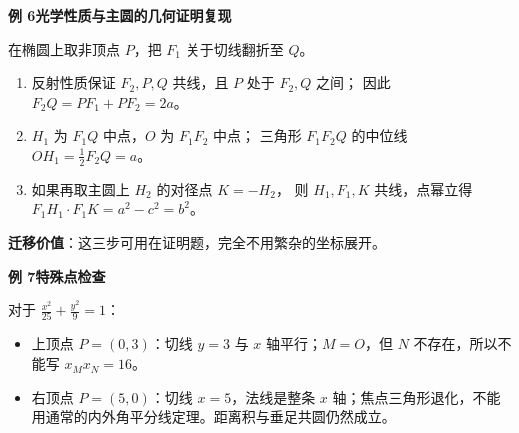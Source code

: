 \begin{examplebox}
\medskip
\textbf{例 6\quad 光学性质与主圆的几何证明复现}

在椭圆上取非顶点 $P$，把 $F_1$ 关于切线翻折至 $Q$。
\begin{enumerate}
\item 反射性质保证 $F_2,P,Q$ 共线，且 $P$ 处于 $F_2,Q$ 之间；
因此 $F_2Q=PF_1+PF_2=2a$。
\item $H_1$ 为 $F_1Q$ 中点，$O$ 为 $F_1F_2$ 中点；
三角形 $F_1F_2Q$ 的中位线 $OH_1=\frac12F_2Q=a$。
\item 如果再取主圆上 $H_2$ 的对径点 $K=-H_2$，
则 $H_1,F_1,K$ 共线，点幂立得
$F_1H_1\cdot F_1K=a^2-c^2=b^2$。
\end{enumerate}
\textbf{迁移价值}：这三步可用在证明题，完全不用繁杂的坐标展开。

\medskip
\textbf{例 7\quad 特殊点检查}

对于 $\frac{x^2}{25}+\frac{y^2}{9}=1$：
\begin{itemize}
\item 上顶点 $P=(0,3)$：切线 $y=3$ 与 $x$ 轴平行；$M=O$，但 $N$ 不存在，所以不能写 $x_Mx_N=16$。
\item 右顶点 $P=(5,0)$：切线 $x=5$，法线是整条 $x$ 轴；焦点三角形退化，不能用通常的内外角平分线定理。距离积与垂足共圆仍然成立。
\end{itemize}
\end{examplebox}
